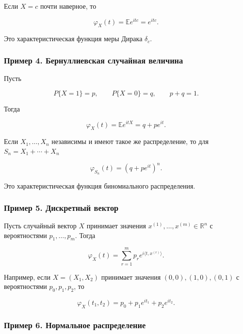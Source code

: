 \documentclass[
  11pt,
  a4paper,
]{article}
\begin{document}
Если \(X=c\) почти наверное, то

\[
\varphi_X(t)=\mathbb E e^{itc}=e^{itc}.
\]

Это характеристическая функция меры Дирака \(\delta_c\).

\subsubsection{Пример 4. Бернуллиевская случайная
величина}\label{ux43fux440ux438ux43cux435ux440-4.-ux431ux435ux440ux43dux443ux43bux43bux438ux435ux432ux441ux43aux430ux44f-ux441ux43bux443ux447ux430ux439ux43dux430ux44f-ux432ux435ux43bux438ux447ux438ux43dux430}

Пусть

\[
P\{X=1\}=p,\qquad P\{X=0\}=q,\qquad p+q=1.
\]

Тогда

\[
\varphi_X(t)=\mathbb E e^{itX}=q+pe^{it}.
\]

Если \(X_1,\ldots,X_n\) независимы и имеют такое же распределение, то
для \(S_n=X_1+\cdots+X_n\)

\[
\varphi_{S_n}(t)=(q+pe^{it})^n.
\]

Это характеристическая функция биномиального распределения.

\subsubsection{Пример 5. Дискретный
вектор}\label{ux43fux440ux438ux43cux435ux440-5.-ux434ux438ux441ux43aux440ux435ux442ux43dux44bux439-ux432ux435ux43aux442ux43eux440}

Пусть случайный вектор \(X\) принимает значения
\(x^{(1)},\ldots,x^{(m)}\in\mathbb R^n\) с вероятностями
\(p_1,\ldots,p_m\). Тогда

\[
\varphi_X(t)=\sum_{r=1}^m p_r e^{i\langle t,x^{(r)}\rangle}.
\]

Например, если \(X=(X_1,X_2)\) принимает значения \((0,0),(1,0),(0,1)\)
с вероятностями \(p_0,p_1,p_2\), то

\[
\varphi_X(t_1,t_2)=p_0+p_1e^{it_1}+p_2e^{it_2}.
\]

\subsubsection{Пример 6. Нормальное
распределение}\label{ux43fux440ux438ux43cux435ux440-6.-ux43dux43eux440ux43cux430ux43bux44cux43dux43eux435-ux440ux430ux441ux43fux440ux435ux434ux435ux43bux435ux43dux438ux435}
\end{document}
